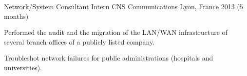 \begin{cventries}
  \cventry
  {Network/System Consultant Intern} %
  {CNS Communications} %
  {Lyon, France} %
    {2013 (5 months)} %
    {
      \begin{cvitems} %
      \item {Performed the audit and the migration of the LAN/WAN infrastructure of several branch offices of a publicly listed company.}
      \item {Troubleshot network failures for public administrations (hospitals and universities).}
      \end{cvitems}
    }


\end{cventries}

